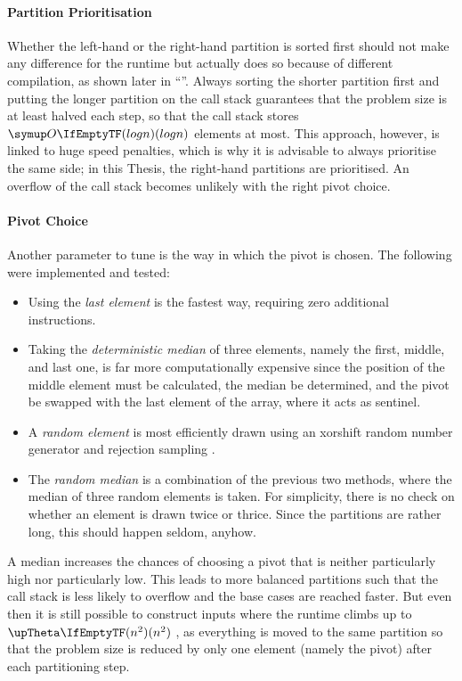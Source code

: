 \paragraph{Partition Prioritisation}
Whether the left-hand or the right-hand partition is sorted first should not make any difference for the runtime but actually does so because of different compilation, as shown later in \enquote{}.
Always sorting the shorter partition first and putting the longer partition on the call stack guarantees that the problem size is at least halved each step, so that the call stack stores \(\bigoh{log n}\) elements at most.
This approach, however, is linked to huge speed penalties, which is why it is advisable to always prioritise the same side;
in this Thesis, the right-hand partitions are prioritised.
An overflow of the call stack becomes unlikely with the right pivot choice.


\paragraph{Pivot Choice}
Another parameter to tune is the way in which the pivot is chosen.
The following were implemented and tested:
\begin{itemize}
	\item
	Using the \emph{last element} is the fastest way, requiring zero additional instructions.

	\item
	Taking the \emph{deterministic median} of three elements, namely the first, middle, and last one, is far more computationally expensive since the position of the middle element must be calculated, the median be determined, and the pivot be swapped with the last element of the array, where it acts as sentinel.

	\item
	A \emph{random element} is most efficiently drawn using an xorshift random number generator and rejection sampling \cite{lukas_geis}.

	\item
	The \emph{random median} is a combination of the previous two methods, where the median of three random elements is taken.
	For simplicity, there is no check on whether an element is drawn twice or thrice.
	Since the partitions are rather long, this should happen seldom, anyhow.
\end{itemize}
A median increases the chances of choosing a pivot that is neither particularly high nor particularly low.
This leads to more balanced partitions such that the call stack is less likely to overflow and the base cases are reached faster.
But even then it is still possible to construct inputs where the runtime climbs up to \(\bigtheta{n^2}\) \cite{erkiö1984worstcase}, as everything is moved to the same partition so that the problem size is reduced by only one element (namely the pivot) after each partitioning step.

